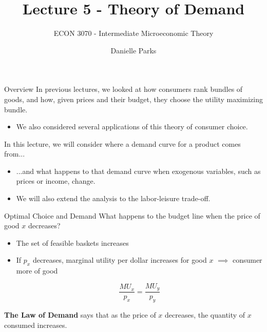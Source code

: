 \documentclass{beamer}
\author{Danielle Parks}
\title{Lecture 5 - Theory of Demand}
\subtitle{ECON 3070 - Intermediate Microeconomic Theory}
\begin{document}
\begin{frame}
  \titlepage
\end{frame}

\begin{frame}{Overview}
  In previous lectures, we looked at how consumers rank bundles of goods, and how, given prices and their budget, they choose the utility maximizing bundle.

  \begin{itemize}
    \item We also considered several applications of this theory of consumer choice.
  \end{itemize}

  \bigskip
  In this lecture, we will consider where a demand curve for a product comes from...

  \begin{itemize}
    \item ...and what happens to that demand curve when exogenous variables, such as prices or income, change.

    \item We will also extend the analysis to the labor-leisure trade-off.
  \end{itemize}
\end{frame}

\begin{frame}{Optimal Choice and Demand}
  What happens to the budget line when the price of good $x$ decreases?

  \bigskip
  \begin{itemize}
    \item The set of feasible baskets increases

    \item If $p_x$ decreases, marginal utility per dollar increases for good $x$ $\implies$ consumer more of good 
    
    $$\frac{MU_x}{p_x} = \frac{MU_y}{p_y}$$
  \end{itemize}

  \bigskip
  \textbf{The Law of Demand} says that as the price of $x$ decreases, the quantity of $x$ consumed increases.
\end{frame}
\end{document}
